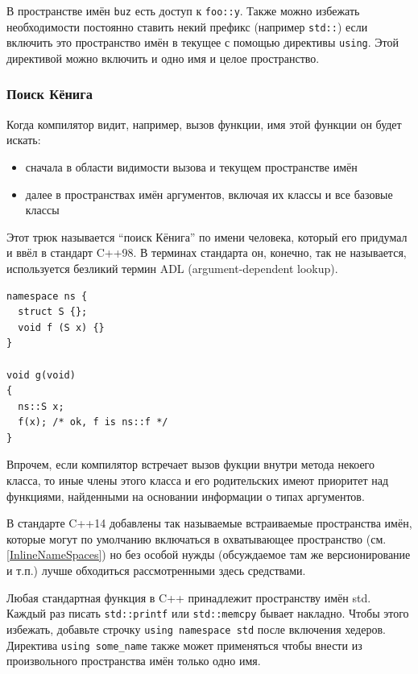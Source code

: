 \documentclass[a4paper,12pt,oneside]{article}
\begin{document}
В пространстве имён \lstinline!buz! есть доступ к \lstinline!foo::y!. Также можно избежать необходимости постоянно ставить некий префикс (например \lstinline!std::!) если включить это пространство имён в текущее с помощью директивы \lstinline!using!. Этой директивой можно включить и одно имя и целое пространство.

\subsubsection{Поиск Кёнига}\label{subsub:ADL}

Когда компилятор видит, например, вызов функции, имя этой функции он будет искать:
\begin{itemize}
\item
сначала в области видимости вызова и текущем пространстве имён
\item
далее в пространствах имён аргументов, включая их классы и все базовые классы
\end{itemize}

Этот трюк называется ``поиск Кёнига'' по имени человека, который его придумал и ввёл в стандарт C++98. В терминах стандарта он, конечно, так не называется, используется безликий термин ADL (argument-dependent lookup).

\begin{lstlisting}
namespace ns {
  struct S {};
  void f (S x) {}
}

void g(void)
{
  ns::S x;
  f(x); /* ok, f is ns::f */
}
\end{lstlisting}

Впрочем, если компилятор встречает вызов фукции внутри метода некоего класса, то иные члены этого класса и его родительских имеют приоритет над функциями, найденными на основании информации о типах аргументов.

В стандарте C++14 добавлены так называемые встраиваемые пространства имён, которые могут по умолчанию включаться в охватывающее пространство (см. \ref{InlineNameSpaces}) но без особой нужды (обсуждаемое там же версионирование и т.п.) лучше обходиться рассмотренными здесь средствами.

Любая стандартная функция в C++ принадлежит пространству имён std. Каждый раз писать \lstinline!std::printf! или \lstinline!std::memcpy! бывает накладно. Чтобы этого избежать, добавьте строчку \lstinline!using namespace std! после включения хедеров. Директива \lstinline!using some_name! также может применяться чтобы внести из произвольного пространства имён только одно имя.
\end{document}
